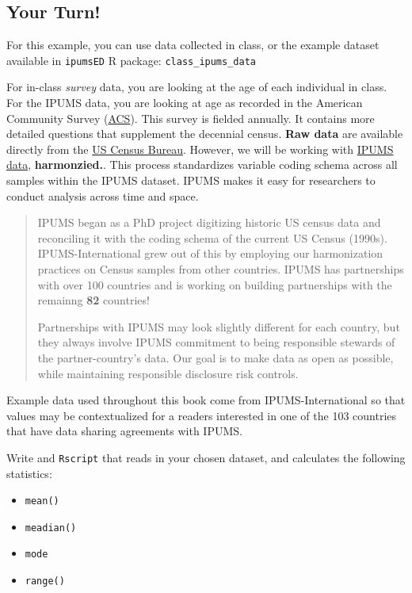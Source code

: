 \documentclass[
]{book}
\providecommand{\tightlist}{%
  \setlength{\itemsep}{0pt}\setlength{\parskip}{0pt}}
\begin{document}
\hypertarget{your-turn}{%
\subsection{Your Turn!}\label{your-turn}}

For this example, you can use data collected in class, or the example dataset available in \texttt{ipumsED} R package: \texttt{class\_ipums\_data}

For in-class \emph{survey} data, you are looking at the age of each individual in class.
For the IPUMS data, you are looking at age as recorded in the American Community Survey
(\href{https://www.census.gov/programs-surveys/acs}{ACS}). This survey is fielded
annually. It contains more detailed questions that supplement the decennial census. \textbf{Raw data} are available directly from the \href{https://www.census.gov/programs-surveys/acs/data.html}{US Census Bureau}. However, we will be working with \href{https://ipums.org}{IPUMS data}, \textbf{harmonzied.}. This process standardizes variable coding schema across all samples within the IPUMS dataset. IPUMS makes it easy for researchers to conduct analysis across time and space.

\begin{quote}
IPUMS began as a PhD project digitizing historic US census data and reconciling
it with the coding schema of the current US Census (1990s). IPUMS-International grew out
of this by employing our harmonization practices on Census samples from other countries.
IPUMS has partnerships with over 100 countries and is working on building partnerships with the
remainng \textbf{82} countries!

Partnerships with IPUMS may look slightly different for each country, but they always
involve IPUMS commitment to being responsible stewards of the partner-country's data.
Our goal is to make data as open as possible, while maintaining responsible disclosure risk controls.
\end{quote}

Example data used throughout this book come from IPUMS-International so that values may be contextualized for a readers interested in one of the 103 countries that have data sharing agreements with IPUMS.

Write and \texttt{Rscript} that reads in your chosen dataset, and calculates the
following statistics:

\begin{itemize}
\tightlist
\item
  \texttt{mean()}
\item
  \texttt{meadian()}
\item
  \texttt{mode}
\item
  \texttt{range()}
\end{itemize}
\end{document}
